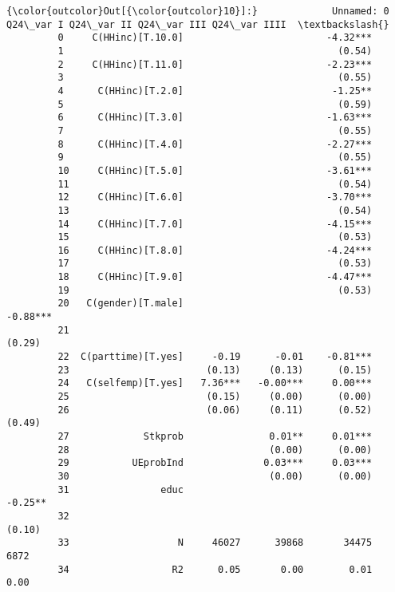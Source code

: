 \documentclass[12pt,notitlepage,onecolumn,aps,pra]{revtex4-1}
\begin{document}
\begin{Verbatim}[commandchars=\\\{\}]
{\color{outcolor}Out[{\color{outcolor}10}]:}             Unnamed: 0 Q24\_var I Q24\_var II Q24\_var III Q24\_var IIII  \textbackslash{}
         0     C(HHinc)[T.10.0]                         -4.32***                
         1                                                (0.54)                
         2     C(HHinc)[T.11.0]                         -2.23***                
         3                                                (0.55)                
         4      C(HHinc)[T.2.0]                          -1.25**                
         5                                                (0.59)                
         6      C(HHinc)[T.3.0]                         -1.63***                
         7                                                (0.55)                
         8      C(HHinc)[T.4.0]                         -2.27***                
         9                                                (0.55)                
         10     C(HHinc)[T.5.0]                         -3.61***                
         11                                               (0.54)                
         12     C(HHinc)[T.6.0]                         -3.70***                
         13                                               (0.54)                
         14     C(HHinc)[T.7.0]                         -4.15***                
         15                                               (0.53)                
         16     C(HHinc)[T.8.0]                         -4.24***                
         17                                               (0.53)                
         18     C(HHinc)[T.9.0]                         -4.47***                
         19                                               (0.53)                
         20   C(gender)[T.male]                                      -0.88***   
         21                                                            (0.29)   
         22  C(parttime)[T.yes]     -0.19      -0.01    -0.81***                
         23                        (0.13)     (0.13)      (0.15)                
         24   C(selfemp)[T.yes]   7.36***   -0.00***     0.00***                
         25                        (0.15)     (0.00)      (0.00)                
         26                        (0.06)     (0.11)      (0.52)       (0.49)   
         27             Stkprob               0.01**     0.01***                
         28                                   (0.00)      (0.00)                
         29           UEprobInd              0.03***     0.03***                
         30                                   (0.00)      (0.00)                
         31                educ                                       -0.25**   
         32                                                            (0.10)   
         33                   N     46027      39868       34475         6872   
         34                  R2      0.05       0.00        0.01         0.00   
         

\end{Verbatim}
\end{document}
